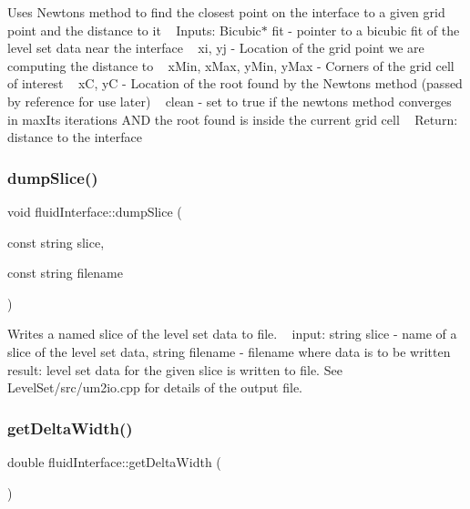 Uses Newtons method to find the closest point on the interface to a given grid point and the distance to it ~\newline
Inputs\+: Bicubic$\ast$ fit -\/ pointer to a bicubic fit of the level set data near the interface ~\newline
 xi, yj -\/ Location of the grid point we are computing the distance to ~\newline
 x\+Min, x\+Max, y\+Min, y\+Max -\/ Corners of the grid cell of interest ~\newline
 xC, yC -\/ Location of the root found by the Newton\textquotesingle{}s method (passed by reference for use later) ~\newline
 clean -\/ set to true if the newton\textquotesingle{}s method converges in max\+Its iterations A\+ND the root found is inside the current grid cell ~\newline
Return\+: distance to the interface \mbox{\label{classfluidInterface_a52469cc0c935ce4744e380481ae20dfa}} 
\subsubsection{\texorpdfstring{dump\+Slice()}{dumpSlice()}}
{\footnotesize\ttfamily void fluid\+Interface\+::dump\+Slice (\begin{DoxyParamCaption}\item[{const string}]{slice,  }\item[{const string}]{filename }\end{DoxyParamCaption})}

Writes a named slice of the level set data to file. ~\newline
input\+: string slice -\/ name of a slice of the level set data, string filename -\/ filename where data is to be written ~\newline
result\+: level set data for the given slice is written to file. See Level\+Set/src/um2io.\+cpp for details of the output file. \mbox{\label{classfluidInterface_ab23850cf11c459d68af382a95273251a}} 
\subsubsection{\texorpdfstring{get\+Delta\+Width()}{getDeltaWidth()}}
{\footnotesize\ttfamily double fluid\+Interface\+::get\+Delta\+Width (\begin{DoxyParamCaption}{ }\end{DoxyParamCaption})}


